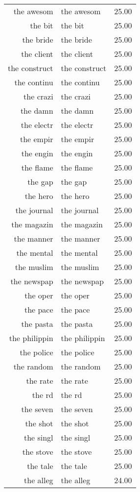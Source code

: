 \begin{table}[ht]
\begin{tabular}{rlr}
  the awesom & the awesom & 25.00 \\ 
  the bit & the bit & 25.00 \\ 
  the bride & the bride & 25.00 \\ 
  the client & the client & 25.00 \\ 
  the construct & the construct & 25.00 \\ 
  the continu & the continu & 25.00 \\ 
  the crazi & the crazi & 25.00 \\ 
  the damn & the damn & 25.00 \\ 
  the electr & the electr & 25.00 \\ 
  the empir & the empir & 25.00 \\ 
  the engin & the engin & 25.00 \\ 
  the flame & the flame & 25.00 \\ 
  the gap & the gap & 25.00 \\ 
  the hero & the hero & 25.00 \\ 
  the journal & the journal & 25.00 \\ 
  the magazin & the magazin & 25.00 \\ 
  the manner & the manner & 25.00 \\ 
  the mental & the mental & 25.00 \\ 
  the muslim & the muslim & 25.00 \\ 
  the newspap & the newspap & 25.00 \\ 
  the oper & the oper & 25.00 \\ 
  the pace & the pace & 25.00 \\ 
  the pasta & the pasta & 25.00 \\ 
  the philippin & the philippin & 25.00 \\ 
  the police & the police & 25.00 \\ 
  the random & the random & 25.00 \\ 
  the rate & the rate & 25.00 \\ 
  the rd & the rd & 25.00 \\ 
  the seven & the seven & 25.00 \\ 
  the shot & the shot & 25.00 \\ 
  the singl & the singl & 25.00 \\ 
  the stove & the stove & 25.00 \\ 
  the tale & the tale & 25.00 \\ 
  the alleg & the alleg & 24.00 \\ 

\end{tabular}
\end{table}
